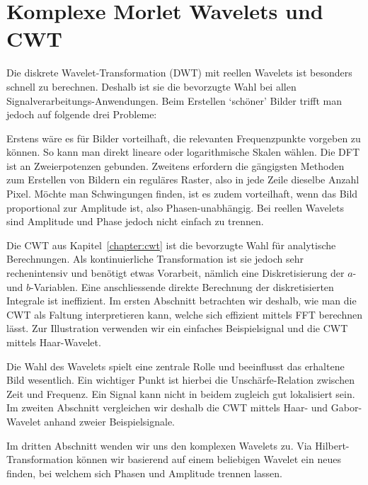 %
%
%

\chapter{Komplexe Morlet Wavelets und CWT\label{chapter:complex}}
\begin{refsection}

Die diskrete Wavelet-Transformation (DWT) mit reellen Wavelets ist besonders schnell zu berechnen.
Deshalb ist sie die bevorzugte Wahl bei allen Signalverarbeitungs-Anwendungen.
Beim Erstellen `schöner' Bilder trifft man jedoch auf folgende drei Probleme:

Erstens wäre es für Bilder vorteilhaft, die relevanten Frequenzpunkte vorgeben zu können.
So kann man direkt lineare oder logarithmische Skalen wählen. Die DFT ist an Zweierpotenzen gebunden.
Zweitens erfordern die gängigsten Methoden zum Erstellen von Bildern ein reguläres Raster, also in jede Zeile dieselbe Anzahl Pixel.
Möchte man Schwingungen finden, ist es zudem vorteilhaft, wenn das Bild proportional zur Amplitude ist, also Phasen-unabhängig.
Bei reellen Wavelets sind Amplitude und Phase jedoch nicht einfach zu trennen.

Die CWT aus Kapitel~\ref{chapter:cwt} ist die bevorzugte Wahl für analytische Berechnungen.
Als kontinuierliche Transformation ist sie jedoch sehr rechenintensiv und benötigt etwas Vorarbeit,
nämlich eine Diskretisierung der $a$- und $b$-Variablen.
Eine anschliessende direkte Berechnung der diskretisierten Integrale ist ineffizient.
Im ersten Abschnitt betrachten wir deshalb, wie man die CWT als Faltung interpretieren kann, welche sich effizient mittels FFT berechnen lässt.
Zur Illustration verwenden wir ein einfaches Beispielsignal und die CWT mittels Haar-Wavelet.

Die Wahl des Wavelets spielt eine zentrale Rolle und beeinflusst das erhaltene Bild wesentlich.
Ein wichtiger Punkt ist hierbei die Unschärfe-Relation zwischen Zeit und Frequenz.
Ein Signal kann nicht in beidem zugleich gut lokalisiert sein.
Im zweiten Abschnitt vergleichen wir deshalb die CWT mittels Haar- und Gabor-Wavelet anhand zweier Beispielsignale.

Im dritten Abschnitt wenden wir uns den komplexen Wavelets zu.
Via Hilbert-Transformation können wir basierend auf einem beliebigen Wavelet ein neues finden, bei welchem sich Phasen und Amplitude trennen lassen.


\end{refsection}
